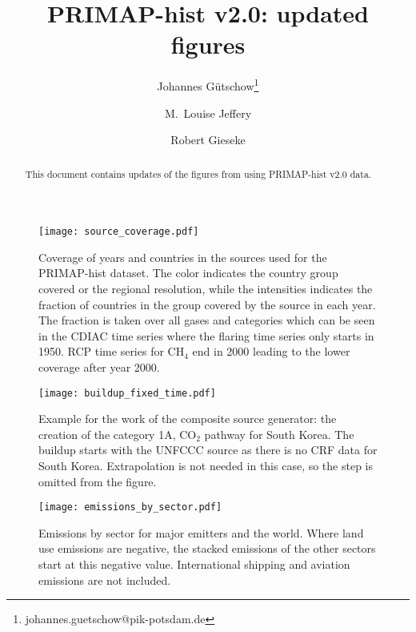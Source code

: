 \documentclass{scrartcl}
\begin{document}
\title{PRIMAP-hist v2.0: updated figures}
\author[1]{Johannes Gütschow\thanks{johannes.guetschow@pik-potsdam.de}}
\author[1]{M.~Louise Jeffery}
\author[1]{Robert Gieseke}






\maketitle
\begin{abstract}
  This document contains updates of the figures from \cite{Gutschow2016b} using PRIMAP-hist v2.0 data.
\end{abstract}

	\begin{figure*}[htbp]
		\begin{center}
			\texttt{[image: source\_coverage.pdf]}
			\caption{Coverage of years and countries in the sources used for the PRIMAP-hist dataset. The color indicates the country group covered or the regional resolution, while the intensities indicates the fraction of countries in the group covered by the source in each year. The fraction is taken over all gases and categories which can be seen in the CDIAC time series where the flaring time series only starts in 1950. RCP time series for $\mathrm{CH}_4$ end in 2000 leading to the lower coverage after year 2000.}
			\label{fig:source_coverage}
		\end{center}
	\end{figure*}

		\begin{figure*}[htbp]
			\begin{center}
				\texttt{[image: buildup\_fixed\_time.pdf]}
				\caption{Example for the work of the composite source generator: the creation of the category 1A, $\mathrm{CO}_2$ pathway for South Korea. The buildup starts with the UNFCCC source as there is no CRF data for South Korea. Extrapolation is not needed in this case, so the step is omitted from the figure.}
				\label{fig:CSG_example}
			\end{center}
		\end{figure*}

		\begin{figure*}[htbp]
			\begin{center}
				\texttt{[image: emissions\_by\_sector.pdf]}
				\caption{Emissions by sector for major emitters and the world. Where land use emissions are negative, the stacked emissions of the other sectors start at this negative value. International shipping and aviation emissions are not included.}
				\label{fig:emis_by_category}
			\end{center}
		\end{figure*}
\end{document}

